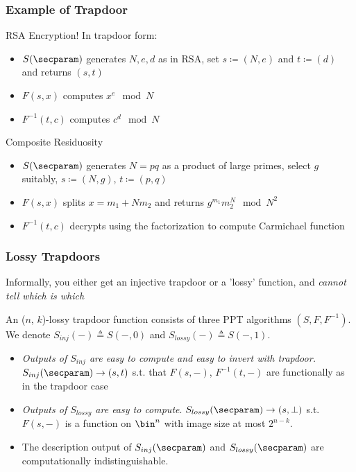 \documentclass{beamer}
\begin{document}
\begin{frame}
    \frametitle{Example of Trapdoor}
    RSA Encryption! In trapdoor form:
    \begin{itemize}
        \item $S(\secparam)$ generates $N, e, d$ as in RSA,
              set $s \coloneqq (N, e)$ and $t \coloneqq (d)$ and returns $(s, t)$
        \item $F(s, x)$ computes $x^e \mod N$
        \item $F^{-1}(t, c)$ computes $c^d \mod N$
    \end{itemize}
    Composite Residuosity
    \begin{itemize}
        \item $S(\secparam)$ generates $N = pq$ as a product of large primes,
              select $g$ suitably, $s \coloneqq (N, g)$, $t \coloneqq (p, q)$
        \item $F(s, x)$ splits $x = m_1 + N m_2$ and returns $g^{m_1} m_2^N \mod N^2$
        \item $F^{-1}(t, c)$ decrypts using the factorization to compute Carmichael function
    \end{itemize}
\end{frame}

\begin{frame}
    \frametitle{Lossy Trapdoors}
    Informally, you either get an injective trapdoor or a 'lossy' function, and \textit{cannot tell which is which}
    \begin{definition}
        An ($n$, $k$)-lossy trapdoor function consists of three PPT algorithms $(S, F, F^{-1})$.
        We denote $S_{inj}({-}) \triangleq S({-}, 0)$ and $S_{lossy}({-}) \triangleq S({-}, 1)$.
        \begin{itemize}
            \item \textit{Outputs of $S_{inj}$ are easy to compute and easy to invert with trapdoor.}
                  $S_{inj}(\secparam) \rightarrow (s, t)$ s.t. that $F(s, {-})$, $F^{-1}(t, {-})$ are functionally as in the trapdoor case
            \item \textit{Outputs of $S_{lossy}$ are easy to compute}.
                  $S_{lossy}(\secparam) \rightarrow (s, \bot)$ s.t. $F(s, {-})$ is a function on $\bin^n$
                  with image size at most $2^{n-k}$.
            \item The description output of $S_{inj}(\secparam)$ and $S_{lossy}(\secparam)$ are computationally indistinguishable.
        \end{itemize}
    \end{definition}
\end{frame}
\end{document}
